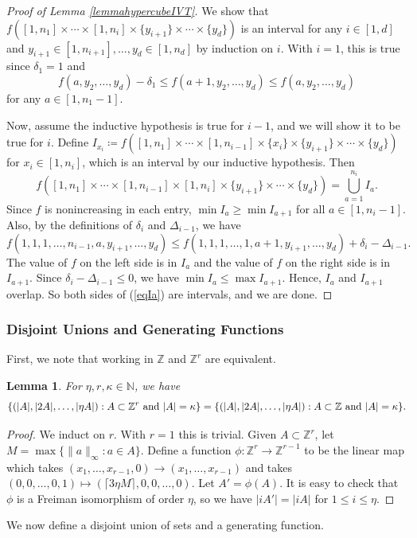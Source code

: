 \documentclass[10pt,a4paper]{article}
\newtheorem{lemma}[theorem]{Lemma}
\theoremstyle{definition}
\theoremstyle{remark}
\numberwithin{equation}{section}
\numberwithin{theorem}{section}
\newcommand{\N}{\mathbb{N}}
\newcommand{\Z}{\mathbb{Z}}
\begin{document}
\begin{proof}[Proof of Lemma \ref{lemmahypercubeIVT}]
    We show that $f([1,n_1]\times \cdots \times [1,n_i] \times \{y_{i+1}\}\times \cdots \times \{y_d\})$ is an interval for any $i \in [1,d]$ and $y_{i+1} \in [1,n_{i+1}],\ldots,y_d\in[1,n_d]$ by induction on $i$. With $i = 1$, this is true since $\delta_1=1$ and \[f(a,y_2,\ldots,y_d) - \delta_1 \leq f(a+1,y_2,\ldots,y_d) \leq f(a,y_2,\ldots,y_d)\] for any $a\in [1,n_{1}-1].$ 
    
    Now, assume the inductive hypothesis is true for $i-1$, and we will show it to be true for $i$. Define $I_{x_{i}} \coloneq  f([1,n_1]\times \cdots \times [1,n_{i-1}] \times \{x_{i}\}\times \{y_{i+1}\}\times \cdots \times \{y_d\})$ for $x_{i} \in [1,n_{i}]$, which is an interval by our inductive hypothesis. Then \begin{equation}\label{eqIa}
        f([1,n_1]\times \cdots \times [1,n_{i-1}] \times [1,n_{i}] \times \{y_{i+1}\} \times \cdots \times \{y_d\}) = \bigcup_{a=1}^{n_{i}} I_{a}.
    \end{equation} Since $f$ is nonincreasing in each entry, $\min I_{a} \geq \min I_{a+1}$ for all $a \in [1,n_{i}-1]$. Also, by the definitions of $\delta_{i}$ and $\Delta_{i-1}$, we have \[ f(1,1,1,\ldots,n_{i-1},a,y_{i+1},\ldots,y_{d}) \leq f(1,1,1,\ldots,1,a+1,y_{i+1},\ldots,y_{d})+\delta_{i}-\Delta_{i-1}.\] The value of $f$ on the left side is in $I_a$ and the value of $f$ on the right side is in $I_{a+1}$. Since $\delta_{i}-\Delta_{i-1} \leq 0$, we have $\min I_{a} \leq \max I_{a+1}$. Hence, $I_a$ and $I_{a+1}$ overlap. So both sides of (\ref{eqIa}) are intervals, and we are done.
\end{proof}
\subsubsection{Disjoint Unions and Generating Functions}\label{sssection: disjointunions}
First, we note that working in $\Z$ and $\Z^r$ are equivalent.
\begin{lemma}\label{lemmadimension}
    For $\eta, r, \kappa \in \N$, we have \[\{(|A|,|2A|,\ldots,|\eta A|):A \subset 
    \Z^r \textnormal{ and } |A| = \kappa \} = \{(|A|,|2A|,\ldots,|\eta A|):A \subset \Z \textnormal{ and }  |A| = 
\kappa \}.\]
\end{lemma}
\begin{proof}
We induct on $r$. With $r = 1$ this is trivial. Given $A \subset \Z^{r}$, let $M = \max\{\|a\|_\infty:a \in A\}$. Define a function $\phi: \Z^r \to \Z^{r-1}$ to be the linear map which takes $(x_1,\ldots,x_{r-1},0) \to (x_1,\ldots,x_{r-1})$ and takes ${(0,0,\ldots,0,1) \mapsto (\lceil 3\eta M\rceil,0,0,\ldots,0)}$. Let $A' = \phi(A)$. It is easy to check that $\phi$ is a Freiman isomorphism of order $\eta$, so we have $|iA'| = |iA|$ for $1 \leq i \leq \eta$.
\end{proof}
We now define a disjoint union of sets and a generating function.
\end{document}
